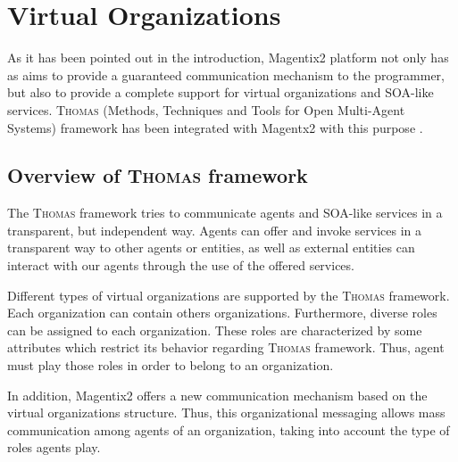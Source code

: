 \chapter{Virtual Organizations}\label{chap:VirtualOrganizations}
As it has been pointed out in the introduction, Magentix2 platform not only has as aims to provide a guaranteed communication mechanism to the programmer, but also to provide a complete support for virtual organizations and SOA-like services. \textsc{Thomas} (Methods, Techniques and Tools for Open Multi-Agent Systems) framework has been integrated with Magentx2 with this purpose \cite{Argente2011}.

\section{Overview of \textsc{Thomas} framework}

The \textsc{Thomas} framework tries to communicate agents and SOA-like services in a transparent, but independent way.  Agents can offer and invoke services in a transparent way to other agents or entities, as well as external entities can interact with our agents through the use of the offered services.


Different types of virtual organizations are supported by the \textsc{Thomas} framework. Each organization can contain others organizations. Furthermore, diverse roles can be assigned to each organization. These roles are characterized by some attributes which restrict its behavior regarding \textsc{Thomas} framework. Thus, agent must play those roles in order to belong to an organization.

In addition, Magentix2 offers a new communication mechanism based on the virtual organizations structure. Thus, this organizational messaging allows mass communication among agents of an organization, taking into account the type of roles agents play.

